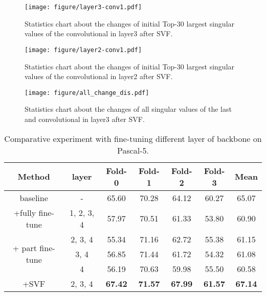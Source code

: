 \documentclass{article}
\begin{document}
\begin{figure*}
	\centering
	\setlength{\abovecaptionskip}{0.cm}
	\texttt{[image: figure/layer3-conv1.pdf]}
	\vspace{-.4em}
	\caption{Statistics chart about the changes of initial Top-30 largest singular values of the  convolutional in layer3 after SVF. }
	\label{fig:layer3_1}
	
\end{figure*}

\begin{figure*}
	\centering
	\setlength{\abovecaptionskip}{0.cm}
	\texttt{[image: figure/layer2-conv1.pdf]}
	\vspace{-.4em}
	\caption{Statistics chart about the changes of initial Top-30 largest singular values of the  convolutional in layer2 after SVF. }
	\label{fig:layer2_1}
\end{figure*}

\begin{figure*}
\vspace{-0.7em}
	\centering
	\setlength{\abovecaptionskip}{0.cm}
	\texttt{[image: figure/all\_change\_dis.pdf]}
	\vspace{-.4em}
	\caption{Statistics chart about the changes of all singular values of the last  and  convolutional in layer3 after SVF.}
	\label{fig:all_change}
\end{figure*}

\begin{table}[]\scriptsize
\centering
\renewcommand\arraystretch{1.3}
\caption{Comparative experiment with fine-tuning different layer of backbone on Pascal-5.}
\label{tab:app_layer_finetune}
\begin{tabular}{c|c|cccc|c}
\bottomrule
Method                          & layer      & Fold-0 & Fold-1 & Fold-2 & Fold-3 & Mean  \\ \hline
baseline                 & -          & 65.60  & 70.28 & 64.12  & 60.27  & 65.07  \\ \hline
+fully fine-tune                 & 1, 2, 3, 4 & 57.97  & 70.51  & 61.33  & 53.80  & 60.90 \\ \hline
\multirow{3}{*}{+ part fine-tune} & 2, 3, 4    & 55.34  & 71.16  & 62.72  & 55.38  & 61.15 \\
                                & 3, 4       & 56.85       & 71.44       & 61.72       & 54.32       & 61.08      \\
                                & 4          & 56.19       & 70.63       & 59.98       & 55.50       & 60.58      \\ \hline
+SVF                            & 2, 3, 4    & \textbf{67.42}  & \textbf{71.57}  & \textbf{67.99}  & \textbf{61.57}  & \textbf{67.14} \\ \bottomrule
\end{tabular}

\end{table}
\end{document}
